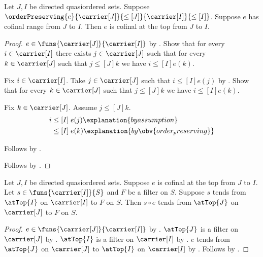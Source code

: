\begin{theorem}\label{monotone_cofinal_range_implies_at_top_cofinal}
    Let $J,I$ be directed quasiordered sets.
    Suppose $\orderPreserving{e}{\carrier[J]}{\leq[J]}
        {\carrier[I]}{\leq[I]}$.
    Suppose $e$ has cofinal range from $J$ to $I$.
    Then $e$ is cofinal at the top from $J$ to $I$.
\end{theorem}
\begin{proof}
    $e\in\funs{\carrier[J]}{\carrier[I]}$ by
        .
    Show that for every $i\in\carrier[I]$ there exists
        $j\in\carrier[J]$ such that for every $k\in\carrier[J]$
        such that $j\mathrel{\leq[J]}k$ we have
        $i\mathrel{\leq[I]}e(k)$.
    \begin{subproof}
        Fix $i\in\carrier[I]$.
        Take $j\in\carrier[J]$ such that
            $i\mathrel{\leq[I]}e(j)$ by
            .
        Show that for every $k\in\carrier[J]$ such that
            $j\mathrel{\leq[J]}k$ we have
            $i\mathrel{\leq[I]}e(k)$.
        \begin{subproof}
            Fix $k\in\carrier[J]$.
            Assume $j\mathrel{\leq[J]}k$.
            \begin{align*}
                i
                    &\mathrel{\leq[I]} e(j)
                        \explanation{by assumption}
                        \\
                    &\mathrel{\leq[I]} e(k)
                        \explanation{by \obv{order_preserving}}
            \end{align*}
        \end{subproof}
        Follows by \auto.
    \end{subproof}
    Follows by .
\end{proof}

\begin{theorem}\label{at_top_cofinal_reindex}
    Let $J,I$ be directed quasiordered sets.
    Suppose $e$ is cofinal at the top from $J$ to $I$.
    Let $s\in\funs{\carrier[I]}{S}$ and $F$ be a filter on $S$.
    Suppose $s$ tends from $\atTop{I}$ on $\carrier[I]$ to $F$ on $S$.
    Then $s\circ e$ tends from $\atTop{J}$ on $\carrier[J]$ to
        $F$ on $S$.
\end{theorem}
\begin{proof}
    $e\in\funs{\carrier[J]}{\carrier[I]}$ by
        .
    $\atTop{J}$ is a filter on $\carrier[J]$ by
        .
    $\atTop{I}$ is a filter on $\carrier[I]$ by
        .
    $e$ tends from $\atTop{J}$ on $\carrier[J]$ to
        $\atTop{I}$ on $\carrier[I]$ by .
    Follows by .
\end{proof}
